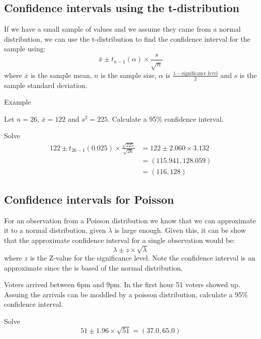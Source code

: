    \subsection{Confidence intervals using the t-distribution}
        If we have a small sample of values and we assume they came from a normal distribution, we can use the t-distribution to find the confidence interval for the sample using: $$ \bar{x} \pm t_{n-1}(\alpha) \times \frac{s}{\sqrt{n}} $$ where $\bar{x}$ is the sample mean, $n$ is the sample size, $\alpha$ is $\displaystyle\frac{1 - \text{significance level}}{2}$ and $s$ is the sample standard deviation.
    
        Example
        \begin{example}
        {
            Let $n = 26$, $\bar{x} = 122$ and $s^2 = 225$. Calculate a 95\% confidence interval.
        }

        \begin{step}{Solve}
        \begin{align*} 
        122 \pm t_{26-1}(0.025) \times \frac{\sqrt{225}}{\sqrt{26}} &= 122 \pm 2.060 \times 3.132 \\ 
        &= (115.941, 128.059)\\
        &= (116, 128) 
        \end{align*}         
        \end{step}

        \end{example}


    \subsection{Confidence intervals for Poisson}
        For an observation from a Poisson distribution we know that we can approximate it to a normal distribution, given $\lambda$ is large enough. Given this, it can be show that the approximate confidence interval for a single observation would be: 
        $$ \lambda \pm z \times \sqrt{\lambda} $$ 
        where $z$ is the Z-value for the significance level. Note the confidence interval is an approximate since the is based of the normal distribution.

        \begin{example}
        {
            Voters arrived between 6pm and 9pm. In the first hour 51 voters showed up. Assuing the arrivals can be moddled by a poisson distribution, calculate a 95\% confidence interval.
        }

        \begin{step}{Solve}
        $$ 51 \pm 1.96 \times \sqrt{51} = (37.0, 65.0) $$
        \end{step}

        \end{example}


